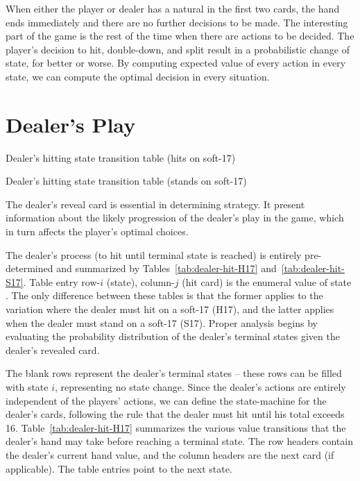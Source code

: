 When either the player or dealer has a natural
in the first two cards, the hand ends immediately
and there are no further decisions to be made.
The interesting part of the game is the rest of the time when
there are actions to be decided.
The player's decision to hit, double-down, and split
result in a probabilistic change of state, for better or worse.
By computing expected value of every action
in every state, we can compute the optimal decision in every situation.  

\section{Dealer's Play}
\label{sec:rules:dealer-play}

\begin{table}[ht!]
\caption{Dealer's hitting state transition table (hits on soft-17)}
\begin{center}
{\small

}
\end{center}
\label{tab:dealer-hit-H17}
\end{table}

\begin{table}[ht!]
\caption{Dealer's hitting state transition table (stands on soft-17)}
\begin{center}
{\small

}
\end{center}
\label{tab:dealer-hit-S17}
\end{table}

The dealer's reveal card is essential in determining strategy.
It present information about the likely progression of the dealer's
play in the game, which in turn affects the player's optimal choices.

The dealer's process (to hit until terminal state is reached)
is entirely pre-determined and summarized by Tables~\ref{tab:dealer-hit-H17}
and~\ref{tab:dealer-hit-S17}.
Table entry row-$i$ (state), column-$j$ (hit card) is the enumeral value
of state .
The only difference between these tables is that the former
applies to the variation where the dealer must hit on a soft-17 (H17),
and the latter applies when the dealer must stand on a soft-17 (S17).
Proper analysis begins by evaluating the probability distribution
of the dealer's terminal states given the dealer's revealed card. 

The blank rows represent the dealer's terminal states --
these rows can be filled with state $i$, representing no state change.
Since the dealer's actions are entirely independent of 
the players' actions, we can define the state-machine
for the dealer's cards, following the rule that the dealer
must hit until his total exceeds 16.
Table~\ref{tab:dealer-hit-H17} summarizes the various
value transitions that the dealer's hand may take
before reaching a terminal state.
The row headers contain the dealer's current hand value, 
and the column headers are the next card (if applicable).
The table entries point to the next state.

